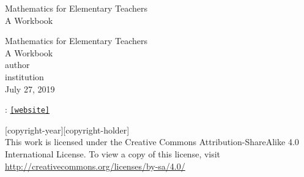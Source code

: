 \documentclass[twoside,11pt,]{book}
\newcommand{\mono}[1]{\texttt{#1}}
\begin{document}
\frontmatter
\thispagestyle{empty}
{\centering
\vspace*{0.28\textheight}
{\Huge Mathematics for Elementary Teachers}\\[2\baselineskip]
{\LARGE A Workbook}\\
}
\clearpage
\thispagestyle{empty}
\null%
\clearpage
\thispagestyle{empty}
{\centering
\vspace*{0.14\textheight}
{\Huge Mathematics for Elementary Teachers}\\[\baselineskip]
{\LARGE A Workbook}\\[3\baselineskip]
{\Large \textbraceleft{}author\textbraceright{}}\\[0.5\baselineskip]
{\Large \textbraceleft{}institution\textbraceright{}}\\[3\baselineskip]
{\Large July 27, 2019}\\}
\clearpage
\thispagestyle{empty}
\hypertarget{g:colophon:idm35257947680}{}
: \href{[website]}{\mono{[website]}}\par\medskip
\noindent\textcopyright{}[copyright-year]\quad{}[copyright-holder]\\[0.5\baselineskip]
 This work is licensed under the Creative Commons Attribution-ShareAlike 4.0 International License. To view a copy of this license, visit \href{http://creativecommons.org/licenses/by-sa/4.0/}{http:\slash{}\slash{}creativecommons.org\slash{}licenses\slash{}by-sa\slash{}4.0\slash{}}\par\medskip
{}
\null\clearpage
\setcounter{tocdepth}{2}
\renewcommand*\contentsname{Contents}
\tableofcontents
\mainmatter
%
%
\typeout{************************************************}
\typeout{************************************************}
%
\end{document}
